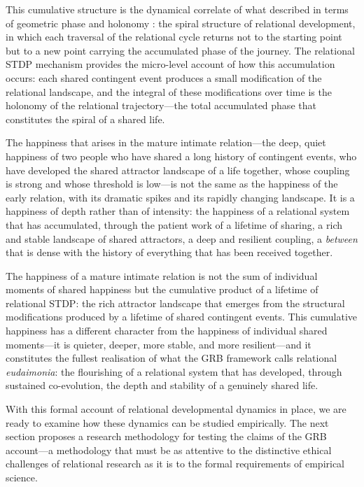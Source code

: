This cumulative structure is the dynamical correlate of what  described in terms of geometric phase and holonomy \parencite{paperix}: the spiral structure of relational development, in which each traversal of the relational cycle returns not to the starting point but to a new point carrying the accumulated phase of the journey. The relational STDP mechanism provides the micro-level account of how this accumulation occurs: each shared contingent event produces a small modification of the relational landscape, and the integral of these modifications over time is the holonomy of the relational trajectory---the total accumulated phase that constitutes the spiral of a shared life.

The happiness that arises in the mature intimate relation---the deep, quiet happiness of two people who have shared a long history of contingent events, who have developed the shared attractor landscape of a life together, whose coupling is strong and whose threshold is low---is not the same as the happiness of the early relation, with its dramatic spikes and its rapidly changing landscape. It is a happiness of depth rather than of intensity: the happiness of a relational system that has accumulated, through the patient work of a lifetime of sharing, a rich and stable landscape of shared attractors, a deep and resilient coupling, a \emph{between} that is dense with the history of everything that has been received together.

\begin{claim}
The happiness of a mature intimate relation is not the sum of individual moments of shared happiness but the cumulative product of a lifetime of relational STDP: the rich attractor landscape that emerges from the structural modifications produced by a lifetime of shared contingent events. This cumulative happiness has a different character from the happiness of individual shared moments---it is quieter, deeper, more stable, and more resilient---and it constitutes the fullest realisation of what the GRB framework calls relational \emph{eudaimonia}: the flourishing of a relational system that has developed, through sustained co-evolution, the depth and stability of a genuinely shared life.
\end{claim}

With this formal account of relational developmental dynamics in place, we are ready to examine how these dynamics can be studied empirically. The next section proposes a research methodology for testing the claims of the GRB account---a methodology that must be as attentive to the distinctive ethical challenges of relational research as it is to the formal requirements of empirical science.

